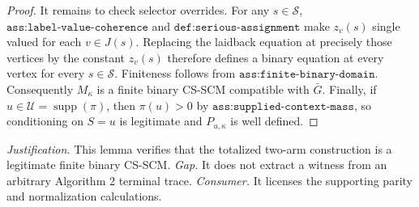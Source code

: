 \documentclass{article}
\begin{document}
\begin{proof}
It remains to check selector overrides. For any \(s\in\mathcal S\), \(\texttt{ass:label-value-coherence}\) and \(\texttt{def:serious-assignment}\) make \(z_v(s)\) single valued for each \(v\in J(s)\). Replacing the laidback equation at precisely those vertices by the constant \(z_v(s)\) therefore defines a binary equation at every vertex for every \(s\in\mathcal S\). Finiteness follows from \(\texttt{ass:finite-binary-domain}\). Consequently \(M_\kappa\) is a finite binary CS-SCM compatible with \(\bar G\). Finally, if \(u\in\mathcal U=\operatorname{supp}(\pi)\), then \(\pi(u)>0\) by \(\texttt{ass:supplied-context-mass}\), so conditioning on \(S=u\) is legitimate and \(P_{u,\kappa}\) is well defined.
\end{proof}
\par\smallskip\noindent \textit{Justification.} This lemma verifies that the totalized two-arm construction is a legitimate finite binary CS-SCM. \textit{Gap.} It does not extract a witness from an arbitrary Algorithm 2 terminal trace. \textit{Consumer.} It licenses the supporting parity and normalization calculations.
\end{document}

